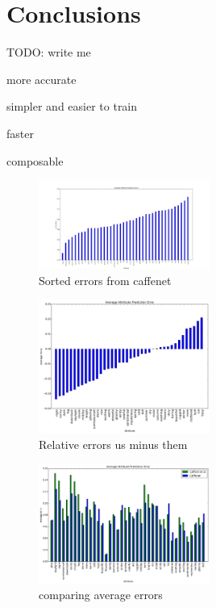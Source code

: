 \documentclass{article}
\begin{document}
\section{Conclusions}

TODO: write me

more accurate

simpler and easier to train

faster

composable


\begin{figure}[t]
	\centering
		\includegraphics[width=0.5\textwidth]{figs/caffenet_avg_err.png}
		\caption{Sorted errors from caffenet}\label{fig:sort}
\end{figure}

\begin{figure}[t]
	\centering
		\includegraphics[width=0.5\textwidth]{figs/rel_err_tight.png}
		\caption{Relative errors us minus them}\label{fig:relerr}
\end{figure}

\begin{figure}[t]
	\centering
		\includegraphics[width=0.5\textwidth]{figs/avg_err_compare_tight.png}
		\caption{comparing average errors}
\end{figure}
\end{document}
